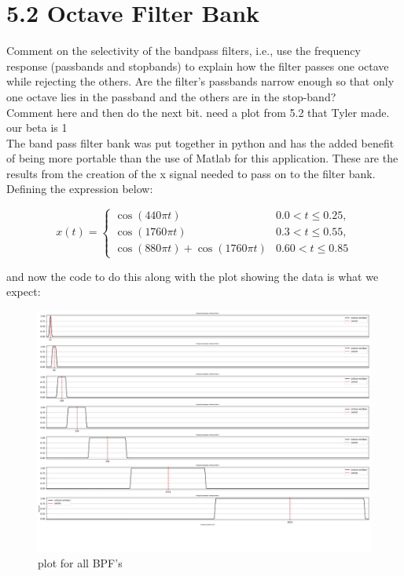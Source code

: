 \documentclass[a4paper, 11pt]{exam}
\begin{document}
\section*{5.2 Octave Filter Bank}
 Comment on the selectivity of the bandpass filters, i.e., use the frequency response (passbands and stopbands) to explain how the filter passes one octave while rejecting the others. Are the filter’s passbands narrow enough so that only one octave lies in the passband and the others are in
 the stop-band?
\\ Comment here and then do the next bit. need a plot from 5.2 that Tyler made. our beta is 1\\
The band pass filter bank was put together in python and has the added benefit of being more portable than the use of Matlab for this application. These are the results from the creation of the x signal needed to pass on to the filter bank. Defining the expression below:
\begin{center}
  \[
    x(t) =
    \begin{cases}
      \cos{(440\pi t)} & 0.0 < t \le 0.25 , \\
      \cos{(1760\pi t)} & 0.3 < t \le 0.55 , \\
      \cos{(880\pi t)} + \cos{(1760\pi t)} & 0.60 < t \le 0.85
    \end{cases}
    \]
\end{center}
\newpage
and now the code to do this along with the plot showing the data is what we expect:\\  
\begin{figure}[h!]
  \centering
  \hspace*{-1.5cm}\includegraphics[width=18cm]{../images/freq_data.png}
  \caption{plot for all BPF's}
  \label{fig:bandpass}
\end{figure}
\end{document}

